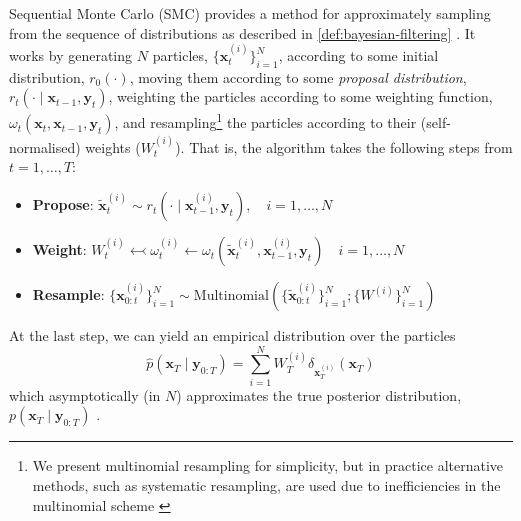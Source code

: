 \begin{definition} \label{def:smc}
    Sequential Monte Carlo (SMC) provides a method for approximately sampling from the sequence of
    distributions as described in \autoref{def:bayesian-filtering}
    \parencite{chopinIntroductionSequentialMonte2020}. It works by generating $N$ particles,
    $\{\mathbf{x}_t^{(i)}\}_{i=1}^N$, according to some initial distribution, $r_0(\cdot)$,
    moving them according to some \emph{proposal distribution},
    $r_t(\cdot \mid \mathbf{x}_{t-1}, \mathbf{y}_{t})$, weighting the particles according to
    some weighting function, $\omega_t(\mathbf{x}_t, \mathbf{x}_{t-1}, \mathbf{y}_t)$, and
    resampling\footnote{We present multinomial resampling for simplicity, but in practice
    alternative methods, such as systematic resampling, are used due to inefficiencies in the
    multinomial scheme \parencite{chopinIntroductionSequentialMonte2020}} the particles according to
    their (self-normalised) weights ($W_t^{(i)}$). That is, the algorithm takes the following steps
    from $t=1,\ldots,T$:
    \begin{itemize}
        \item \textbf{Propose}: $\tilde{\mathbf{x}}_t^{(i)} \sim r_t(\cdot \mid \mathbf{x}_{t-1}^{(i)}, \mathbf{y}_t), \quad i = 1,\ldots,N$
        \item \textbf{Weight}: $W_t^{(i)} \leftarrowtail \omega_t^{(i)} \leftarrow \omega_t(\tilde{\mathbf{x}}_t^{(i)}, \mathbf{x}_{t-1}^{(i)}, \mathbf{y}_t) \quad i = 1,\ldots,N$
        \item \textbf{Resample}: $\{\mathbf{x}_{0:t}^{(i)}\}_{i=1}^N \sim \text{Multinomial}\left(\{\tilde{\mathbf{x}}_{0:t}^{(i)}\}_{i=1}^N; \{W^{(i)}\}_{i=1}^N\right)$
    \end{itemize}
    At the last step, we can yield an empirical distribution over the particles
    \begin{equation*}
        \hat{p}(\mathbf{x}_T \mid \mathbf{y}_{0:T}) = \sum_{i=1}^N W_{T}^{(i)}\delta_{\mathbf{x}_{T}^{(i)}}(\mathbf{x}_T)
    \end{equation*}
    which asymptotically (in $N$) approximates the true posterior distribution,
    $p(\mathbf{x}_T \mid \mathbf{y}_{0:T})$ \parencite{delmoralCentralLimitTheorems2011,chopinIntroductionSequentialMonte2020}.
\end{definition}

